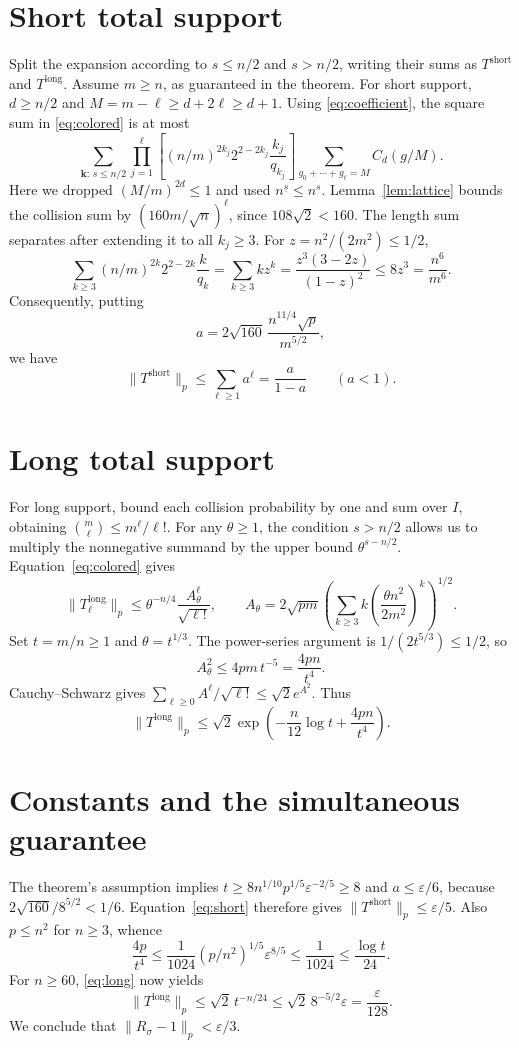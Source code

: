 \documentclass[11pt]{article}
\begin{document}
\section{Short total support}
Split the expansion according to $s\leq n/2$ and $s>n/2$, writing their
sums as $T^{\mathrm{short}}$ and $T^{\mathrm{long}}$.
Assume $m\geq n$, as guaranteed in the theorem. For short support,
$d\geq n/2$ and
$M=m-\ell\geq d+2\ell\geq d+1$.
Using \eqref{eq:coefficient}, the square sum in \eqref{eq:colored} is at most
\[
 \sum_{\boldsymbol k:\,s\leq n/2}
 \prod_{j=1}^\ell\left[
       (n/m)^{2k_j}2^{2-2k_j}\frac{k_j}{q_{k_j}}\right]
 \sum_{g_0+\cdots+g_\ell=M}C_d(g/M).
\]
Here we dropped $(M/m)^{2d}\leq1$ and used
$n^{\underline{s}}\leq n^s$. Lemma~\ref{lem:lattice} bounds the collision
sum by $(160m/\sqrt n)^\ell$, since $108\sqrt2<160$.
The length sum separates after extending it to all $k_j\geq3$. For
$z=n^2/(2m^2)\leq1/2$,
\[
 \sum_{k\geq3}(n/m)^{2k}2^{2-2k}\frac{k}{q_k}
 =\sum_{k\geq3}kz^k
 =\frac{z^3(3-2z)}{(1-z)^2}
 \leq8z^3=\frac{n^6}{m^6}.
\]
Consequently, putting
\[
 a=2\sqrt{160}\,\frac{n^{11/4}\sqrt p}{m^{5/2}},
\]
we have
\begin{equation}\label{eq:short}
 \|T^{\mathrm{short}}\|_p\leq\sum_{\ell\geq1}a^\ell
 =\frac a{1-a}\qquad(a<1).
\end{equation}

\section{Long total support}
For long support, bound each collision probability by one and sum over
$I$, obtaining $\binom m\ell\leq m^\ell/\ell!$.
For any $\theta\geq1$, the condition $s>n/2$ allows us to multiply the
nonnegative summand by the upper bound $\theta^{s-n/2}$.
Equation~\eqref{eq:colored} gives
\[
 \|T_\ell^{\mathrm{long}}\|_p
 \leq\theta^{-n/4}\frac{A_\theta^\ell}{\sqrt{\ell!}},
 \qquad
 A_\theta=2\sqrt{pm}
   \left(\sum_{k\geq3}k
           \left(\frac{\theta n^2}{2m^2}\right)^k\right)^{1/2}.
\]
Set $t=m/n\geq1$ and $\theta=t^{1/3}$. The power-series argument is
$1/(2t^{5/3})\leq1/2$, so
\[
 A_\theta^2\leq4pm\,t^{-5}=\frac{4pn}{t^4}.
\]
Cauchy--Schwarz gives
$\sum_{\ell\geq0}A^\ell/\sqrt{\ell!}\leq\sqrt2e^{A^2}$.
Thus
\begin{equation}\label{eq:long}
 \|T^{\mathrm{long}}\|_p
 \leq\sqrt2\exp\left(-\frac n{12}\log t+\frac{4pn}{t^4}\right).
\end{equation}

\section{Constants and the simultaneous guarantee}
The theorem's assumption implies
$t\geq8n^{1/10}p^{1/5}\varepsilon^{-2/5}\geq8$ and $a\leq\varepsilon/6$,
because $2\sqrt{160}/8^{5/2}<1/6$.
Equation~\eqref{eq:short} therefore gives
$\|T^{\mathrm{short}}\|_p\leq\varepsilon/5$.
Also $p\leq n^2$ for $n\geq3$, whence
\[
 \frac{4p}{t^4}\leq\frac1{1024}(p/n^2)^{1/5}
                  \varepsilon^{8/5}
 \leq\frac1{1024}\leq\frac{\log t}{24}.
\]
For $n\geq60$, \eqref{eq:long} now yields
\[
 \|T^{\mathrm{long}}\|_p
 \leq\sqrt2\,t^{-n/24}
 \leq\sqrt2\,8^{-5/2}\varepsilon
 =\frac\varepsilon{128}.
\]
We conclude that $\|R_\sigma-1\|_p<\varepsilon/3$.
\end{document}
